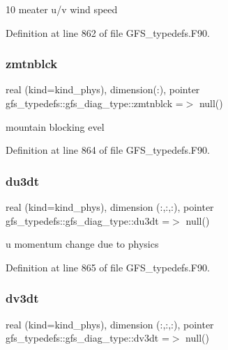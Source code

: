 10 meater u/v wind speed 



Definition at line 862 of file G\+F\+S\+\_\+typedefs.\+F90.

\mbox{\label{structgfs__typedefs_1_1gfs__diag__type_af59a22190caf713ad73c486642628ff5}} 
\subsubsection{zmtnblck}
{\footnotesize\ttfamily real (kind=kind\+\_\+phys), dimension(\+:), pointer gfs\+\_\+typedefs\+::gfs\+\_\+diag\+\_\+type\+::zmtnblck =$>$ null()}



mountain blocking evel 



Definition at line 864 of file G\+F\+S\+\_\+typedefs.\+F90.

\mbox{\label{structgfs__typedefs_1_1gfs__diag__type_aa0f9c88ca2f6791fdb4a5af89b9031f9}} 
\subsubsection{du3dt}
{\footnotesize\ttfamily real (kind=kind\+\_\+phys), dimension (\+:,\+:,\+:), pointer gfs\+\_\+typedefs\+::gfs\+\_\+diag\+\_\+type\+::du3dt =$>$ null()}



u momentum change due to physics 



Definition at line 865 of file G\+F\+S\+\_\+typedefs.\+F90.

\mbox{\label{structgfs__typedefs_1_1gfs__diag__type_a91f60632e0de475fba14dcba674fdf53}} 
\subsubsection{dv3dt}
{\footnotesize\ttfamily real (kind=kind\+\_\+phys), dimension (\+:,\+:,\+:), pointer gfs\+\_\+typedefs\+::gfs\+\_\+diag\+\_\+type\+::dv3dt =$>$ null()}



